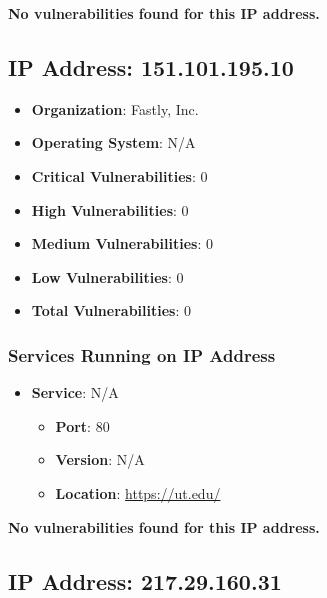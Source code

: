 \documentclass{article}
\begin{document}
\textbf{No vulnerabilities found for this IP address.}




\clearpage



\subsection{IP Address: 151.101.195.10}

\begin{itemize}
    \item \textbf{Organization}: Fastly, Inc.
    \item \textbf{Operating System}:  N/A 
    \item \textbf{Critical Vulnerabilities}: 0
    \item \textbf{High Vulnerabilities}: 0
    \item \textbf{Medium Vulnerabilities}: 0
    \item \textbf{Low Vulnerabilities}: 0
    \item \textbf{Total Vulnerabilities}: 0
\end{itemize}

\subsubsection*{Services Running on IP Address}

\begin{itemize}
    
        \item \textbf{Service}: N/A
        \begin{itemize}
            \item \textbf{Port}: 80
            \item \textbf{Version}:  N/A 
            \item \textbf{Location}: \href{ https://ut.edu/ }{ https://ut.edu/ }
        \end{itemize}
    
\end{itemize}


\textbf{No vulnerabilities found for this IP address.}




\clearpage



\subsection{IP Address: 217.29.160.31}
\end{document}
